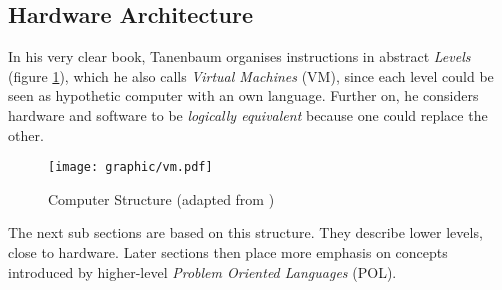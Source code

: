 %
%
%
%
%
%
%

\subsection{Hardware Architecture}
\label{hardware_architecture_heading}

In his very clear book, Tanenbaum \cite{tanenbaum1999} organises instructions
in abstract \emph{Levels} (figure \ref{vm_figure}), which he also calls
\emph{Virtual Machines} (VM), since each level could be seen as hypothetic
computer with an own language. Further on, he considers hardware and software
to be \textit{logically equivalent} because one could replace the other.

\begin{figure}[ht]
    \begin{center}
        \texttt{[image: graphic/vm.pdf]}
        \caption{Computer Structure (adapted from \cite{tanenbaum1999})}
        \label{vm_figure}
    \end{center}
\end{figure}

The next sub sections are based on this structure. They describe lower levels,
close to hardware. Later sections then place more emphasis on concepts
introduced by higher-level \emph{Problem Oriented Languages} (POL).




